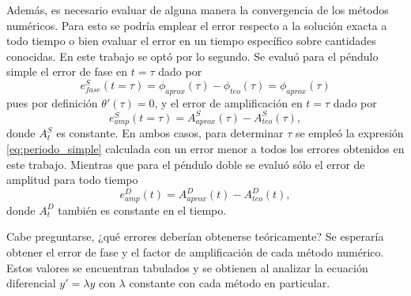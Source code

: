 \documentclass[aps,prb,twocolumn,superscriptaddress,floatfix,longbibliography,10pt]{revtex4-2}
\newcounter{para}
\begin{document}
Además, es necesario evaluar de alguna manera la convergencia de los métodos numéricos. Para esto se podría emplear el error respecto a la solución exacta a todo tiempo o bien evaluar el error en un tiempo específico sobre cantidades conocidas. En este trabajo se optó por lo segundo. Se evaluó para el péndulo simple el error de fase en $t = \tau$ dado por
\begin{equation}
  e^S_{fase}(t = \tau) = \phi_{aprox}(\tau) - \phi_{teo}(\tau) = \phi_{aprox}(\tau)
  \label{eq:simple_e_fase}
\end{equation}
pues por definición $\theta'(\tau) = 0$, y el error de amplificación en $t = \tau$ dado por
\begin{equation}
  e^S_{amp}(t = \tau) = A^S_{aprox}(\tau) - A^S_{teo}(\tau),
  \label{eq:simple_e_amp}
\end{equation}
donde $A^S_{t}$ es constante. En ambos casos, para determinar $\tau$ se empleó la expresión \ref{eq:periodo_simple} calculada con un error menor a todos los errores obtenidos en este trabajo. Mientras que para el péndulo doble se evaluó sólo el error de amplitud para todo tiempo
\begin{equation}
  e^D_{amp}(t) = A^D_{aprox}(t) - A^D_{teo}(t),
  \label{eq:doble_e_amp}
\end{equation}
donde $A^D_{t}$ también es constante en el tiempo.

Cabe preguntarse, ¿qué errores deberían obtenerse teóricamente? Se esperaría obtener el error de fase y el factor de amplificación de cada método numérico. Estos valores se encuentran tabulados y se obtienen al analizar la ecuación diferencial $y' = \lambda y$ con $\lambda$ constante con cada método en particular.
\end{document}
